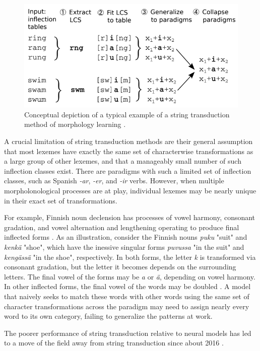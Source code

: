 \begin{figure}[t]
\includegraphics[width=12cm]{images/Hulden2014_diagram.png}
\centering
\caption{Conceptual depiction of a typical example of a string transduction method of morphology learning \parencite{Hulden2014}.}
\end{figure}

A crucial limitation of string transduction methods are their general assumption that most lexemes have exactly the same set of characterwise transformations as a large group of other lexemes, and that a manageably small number of such inflection classes exist. There are paradigms with such a limited set of inflection classes, such as Spanish \textit{-ar}, \textit{-er}, and \textit{-ir} verbs. However, when multiple morpholonological processes are at play, individual lexemes may be nearly unique in their exact set of transformations.

For example, Finnish noun declension has processes of vowel harmony, consonant gradation, and vowel alternation and lengthening operating to produce final inflected forms \parencite{Ranta2008}. As an illustration, consider the Finnish nouns \textit{puku} "suit" and \textit{kenkä} "shoe", which have the inessive singular forms \textit{puvussa} "in the suit" and \textit{kengässä} "in the shoe", respectively. In both forms, the letter \textit{k} is transformed via consonant gradation, but the letter it becomes depends on the surrounding letters. The final vowel of the forms may be \textit{a} or \textit{ä}, depending on vowel harmony. In other inflected forms, the final vowel of the words may be doubled \parencite{Wiktionary}. A model that naively seeks to match these words with other words using the same set of character transformations across the paradigm may need to assign nearly every word to its own category, failing to generalize the patterns at work.

The poorer performance of string transduction relative to neural models has led to a move of the field away from string transduction since about 2016 \parencite{Cotterell2018b}.

